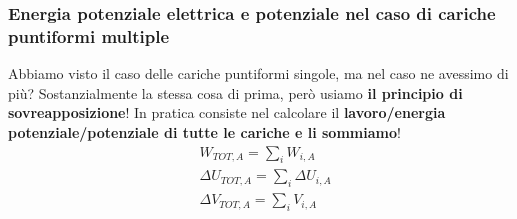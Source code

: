         \subsubsection{Energia potenziale elettrica e potenziale nel caso di cariche puntiformi multiple}
            Abbiamo visto il caso delle cariche puntiformi singole, ma nel caso ne avessimo di più? Sostanzialmente la stessa cosa di prima, però usiamo \textbf{il principio di sovreapposizione}! In pratica consiste nel calcolare il \textbf{lavoro/energia potenziale/potenziale di tutte le cariche e li sommiamo}!
            \begin{align*}
                &W_{TOT, A}=\sum_i W_{i, A}\\
                &\Delta U_{TOT, A} = \sum_i \Delta U_{i, A}\\
                &\Delta V_{TOT, A}=\sum_i V_{i, A}
            \end{align*}